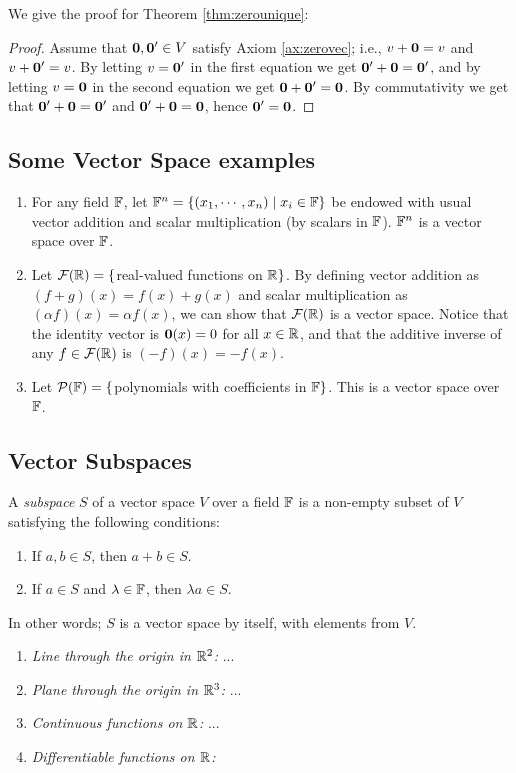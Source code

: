 We give the proof for Theorem \ref{thm:zerounique}:
\begin{proof}
	Assume that $\mathbf{0},\mathbf{0}'\in V$ satisfy Axiom \ref{ax:zerovec}; i.e., $v+\mathbf{0}=v$ and $v+\mathbf{0}'=v$. By letting $v=\mathbf{0}'$ in the first equation we get $\mathbf{0}'+\mathbf{0}=\mathbf{0}'$, and by letting $v=\mathbf{0}$ in the second equation we get $\mathbf{0}+\mathbf{0}'=\mathbf{0}$. By commutativity we get that $\mathbf{0}'+\mathbf{0}=\mathbf{0}'$ and $\mathbf{0}'+\mathbf{0}=\mathbf{0}$, hence $\mathbf{0}'=\mathbf{0}$.
\end{proof}

\subsection{Some Vector Space examples}
\begin{enumerate}[Ex. A)]
\item For any field $\mathbb{F}$, let $\mathbb{F}^n=\{(x_1,\cdots,x_n) \mid x_i\in\mathbb{F}\}$ be endowed with usual vector addition and scalar multiplication (by scalars in $\mathbb{F}$). $\mathbb{F}^n$ is a vector space over $\mathbb{F}$.

\item Let $\mathcal{F}(\mathbb{R})=\{$real-valued functions on $\mathbb{R}\}$. By defining vector addition as $(f+g)(x)=f(x)+g(x)$ and scalar multiplication as $(\alpha f)(x)=\alpha f(x)$, we can show that $\mathcal{F}(\mathbb{R})$ is a vector space. Notice that the identity vector is $\mathbf{0}(x)=0$ for all $x\in\mathbb{R}$, and that the additive inverse of any $f\in\mathcal{F}(\mathbb{R})$ is $(-f)(x)=-f(x)$.

\item Let $\mathcal{P}(\mathbb{F})=\{$polynomials with coefficients in $\mathbb{F}\}$. This is a vector space over $\mathbb{F}$.
\end{enumerate}

\subsection{Vector Subspaces}
\begin{definition}
	A \emph{subspace} $S$ of a vector space $V$ over a field $\mathbb{F}$ is a non-empty subset of $V$ satisfying the following conditions:
    \begin{enumerate}
    \item If $a,b\in S$, then $a+b\in S$.
    \item If $a\in S$ and $\lambda\in\mathbb{F}$, then $\lambda a\in S$.
    \end{enumerate}
\end{definition}

In other words; $S$ is a vector space by itself, with elements from $V$.

\begin{enumerate}[Ex. A)]
\item \emph{Line through the origin in $\mathbb{R}^2$:} ...
\item \emph{Plane through the origin in $\mathbb{R}^3$:} ...
\item \emph{Continuous functions on $\mathbb{R}$:} ...
\item \emph{Differentiable functions on $\mathbb{R}$:}
\end{enumerate}

